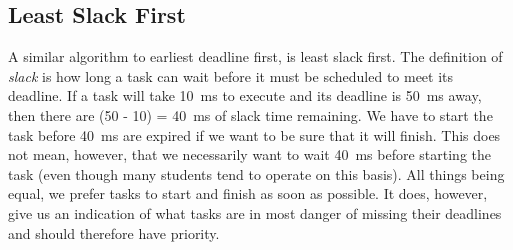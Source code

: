 \subsection*{Least Slack First}
A similar algorithm to earliest deadline first, is least slack first. The definition of \textit{slack} is how long a task can wait before it must be scheduled to meet its deadline. If a task will take 10~ms to execute and its deadline is 50~ms away, then there are (50 - 10) = 40~ms of slack time remaining. We have to start the task before 40~ms are expired if we want to be sure that it will finish. This does not mean, however, that we necessarily want to wait 40~ms before starting the task (even though many students tend to operate on this basis). All things being equal, we prefer tasks to start and finish as soon as possible. It does, however, give us an indication of what tasks are in most danger of missing their deadlines and should therefore have priority.





